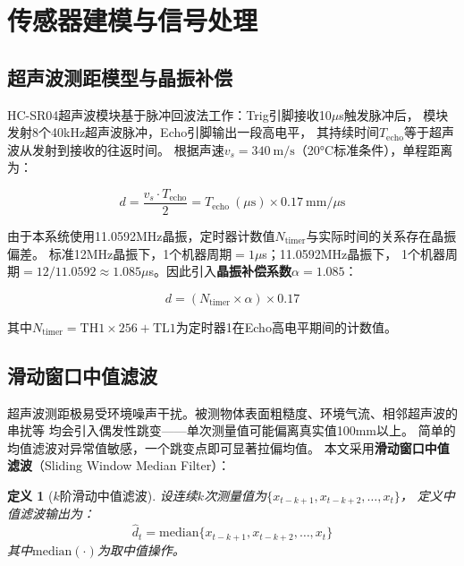 \documentclass[12pt,a4paper]{ctexart}
\newtheorem{definition}{定义}[section]
\begin{document}
\section{传感器建模与信号处理}

\subsection{超声波测距模型与晶振补偿}

HC-SR04超声波模块基于脉冲回波法工作：Trig引脚接收10$\mu$s触发脉冲后，
模块发射8个40kHz超声波脉冲，Echo引脚输出一段高电平，
其持续时间$T_{\text{echo}}$等于超声波从发射到接收的往返时间。
根据声速$v_s = 340\ \text{m/s}$（20°C标准条件），单程距离为：

\begin{equation}
d = \frac{v_s \cdot T_{\text{echo}}}{2} = T_{\text{echo}}\ (\mu\text{s}) \times 0.17\ \text{mm/}\mu\text{s}
\label{eq:basic}
\end{equation}

由于本系统使用11.0592MHz晶振，定时器计数值$N_{\text{timer}}$与实际时间的关系存在晶振偏差。
标准12MHz晶振下，1个机器周期$=1\mu$s；11.0592MHz晶振下，
1个机器周期$=12 / 11.0592 \approx 1.085\mu$s。因此引入\textbf{晶振补偿系数}$\alpha = 1.085$：

\begin{equation}
d = (N_{\text{timer}} \times \alpha) \times 0.17
\label{eq:compensated}
\end{equation}

其中$N_{\text{timer}} = \text{TH1} \times 256 + \text{TL1}$为定时器1在Echo高电平期间的计数值。

\subsection{滑动窗口中值滤波}

超声波测距极易受环境噪声干扰。被测物体表面粗糙度、环境气流、相邻超声波的串扰等
均会引入偶发性跳变——单次测量值可能偏离真实值100mm以上。
简单的均值滤波对异常值敏感，一个跳变点即可显著拉偏均值。
本文采用\textbf{滑动窗口中值滤波}（Sliding Window Median Filter）：

\begin{definition}[$k$阶滑动中值滤波]
设连续$k$次测量值为$\{x_{t-k+1}, x_{t-k+2}, \ldots, x_t\}$，
定义中值滤波输出为：
\begin{equation}
\hat{d}_t = \text{median}\{x_{t-k+1}, x_{t-k+2}, \ldots, x_t\}
\label{eq:median}
\end{equation}
其中$\text{median}(\cdot)$为取中值操作。
\end{definition}
\end{document}
